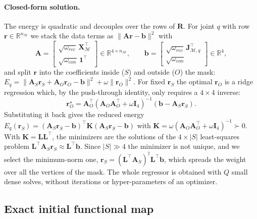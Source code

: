 \documentclass[11pt]{article}
\newcommand{\M}{\mathcal{M}}
\newcommand{\R}{\mathbb{R}}
\newcommand{\Rspat}{\mathbf{R}}
\newcommand{\X}{\mathbf{X}}
\newcommand{\J}{\mathbf{J}}
\newcommand{\one}{\mathbf{1}}
\begin{document}
\paragraph{Closed-form solution.} The energy is quadratic and decouples over
the rows of $\Rspat$. For joint $q$ with row $\mathbf{r} \in \R^{n_\M}$ we stack
the data terms as $\|\mathbf{A}\mathbf{r} - \mathbf{b}\|^2$ with
\begin{equation}
  \mathbf{A} = \begin{bmatrix} \sqrt{\omega_{rec}}\, \X_\M^\top \\ \sqrt{\omega_{con}}\, \one^\top \end{bmatrix} \in \R^{4 \times n_\M},
  \qquad
  \mathbf{b} = \begin{bmatrix} \sqrt{\omega_{rec}}\, \J_{\M,q}^\top \\ \sqrt{\omega_{con}} \end{bmatrix} \in \R^{4},
\end{equation}
and split $\mathbf{r}$ into the coefficients inside ($S$) and outside ($O$) the
mask: $E_q = \|\mathbf{A}_S\mathbf{r}_S + \mathbf{A}_O\mathbf{r}_O - \mathbf{b}\|^2 + \omega \|\mathbf{r}_O\|^2$.
For fixed $\mathbf{r}_S$ the optimal $\mathbf{r}_O$ is a ridge regression which,
by the push-through identity, only requires a $4\times4$ inverse:
\begin{equation}
  \mathbf{r}_O^\star = \mathbf{A}_O^\top \left(\mathbf{A}_O\mathbf{A}_O^\top + \omega \mathbf{I}_4\right)^{-1} (\mathbf{b} - \mathbf{A}_S\mathbf{r}_S).
\end{equation}
Substituting it back gives the reduced energy
$E_q(\mathbf{r}_S) = (\mathbf{A}_S\mathbf{r}_S - \mathbf{b})^\top \mathbf{K} (\mathbf{A}_S\mathbf{r}_S - \mathbf{b})$
with $\mathbf{K} = \omega (\mathbf{A}_O\mathbf{A}_O^\top + \omega\mathbf{I}_4)^{-1} \succ 0$.
With $\mathbf{K} = \mathbf{L}\mathbf{L}^\top$, the minimizers are the solutions of
the $4 \times |S|$ least-squares problem $\mathbf{L}^\top\mathbf{A}_S \mathbf{r}_S \approx \mathbf{L}^\top \mathbf{b}$.
Since $|S| \gg 4$ the minimizer is not unique, and we select the minimum-norm
one, $\mathbf{r}_S = (\mathbf{L}^\top\mathbf{A}_S)^\dagger \mathbf{L}^\top\mathbf{b}$,
which spreads the weight over all the vertices of the mask. The whole
regressor is obtained with $Q$ small dense solves, without iterations or
hyper-parameters of an optimizer.

\subsection{Exact initial functional map}
\label{sec:fmap}
\end{document}
